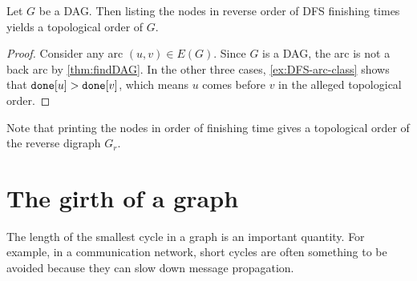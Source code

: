 \begin{Theorem}
Let $G$ be a DAG. Then listing the nodes in reverse order of DFS
finishing times yields a topological order of $G$.
\end{Theorem}
\begin{proof} 
Consider any arc $(u,v) \in E(G)$. 
Since $G$ is a DAG, the arc is not a back arc by \cref{thm:findDAG}. 
In the other three cases, \cref{ex:DFS-arc-class} shows that $\operatorname{\text{\texttt{done}}}[u] > \operatorname{\text{\texttt{done}}}[v]$,
which means $u$ comes before $v$ in the alleged topological order.
\end{proof}

Note that printing the nodes in order of finishing time gives a topological order of the reverse digraph $G_r$.



%
%

%

\section{The girth of a graph} \label{sec:girth}
The length of the smallest cycle in a graph is an important quantity. 
For example, in a communication network, short cycles are often something to be
avoided because they can slow down message propagation.

